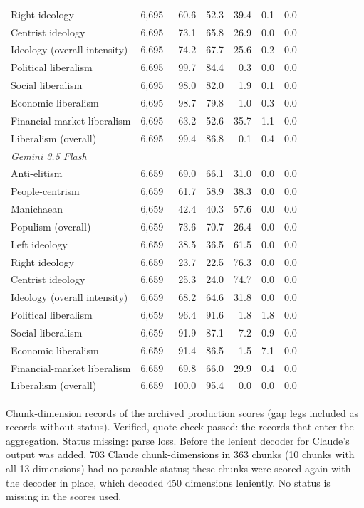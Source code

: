 \begin{table}[ht]
{\begin{tabular}{lrrrrrr}
\quad Right ideology & 6,695 & 60.6 & 52.3 & 39.4 & 0.1 & 0.0 \\
\quad Centrist ideology & 6,695 & 73.1 & 65.8 & 26.9 & 0.0 & 0.0 \\
\quad Ideology (overall intensity) & 6,695 & 74.2 & 67.7 & 25.6 & 0.2 & 0.0 \\
\quad Political liberalism & 6,695 & 99.7 & 84.4 & 0.3 & 0.0 & 0.0 \\
\quad Social liberalism & 6,695 & 98.0 & 82.0 & 1.9 & 0.1 & 0.0 \\
\quad Economic liberalism & 6,695 & 98.7 & 79.8 & 1.0 & 0.3 & 0.0 \\
\quad Financial-market liberalism & 6,695 & 63.2 & 52.6 & 35.7 & 1.1 & 0.0 \\
\quad Liberalism (overall) & 6,695 & 99.4 & 86.8 & 0.1 & 0.4 & 0.0 \\
\multicolumn{7}{l}{\emph{Gemini 3.5 Flash}} \\
\quad Anti-elitism & 6,659 & 69.0 & 66.1 & 31.0 & 0.0 & 0.0 \\
\quad People-centrism & 6,659 & 61.7 & 58.9 & 38.3 & 0.0 & 0.0 \\
\quad Manichaean & 6,659 & 42.4 & 40.3 & 57.6 & 0.0 & 0.0 \\
\quad Populism (overall) & 6,659 & 73.6 & 70.7 & 26.4 & 0.0 & 0.0 \\
\quad Left ideology & 6,659 & 38.5 & 36.5 & 61.5 & 0.0 & 0.0 \\
\quad Right ideology & 6,659 & 23.7 & 22.5 & 76.3 & 0.0 & 0.0 \\
\quad Centrist ideology & 6,659 & 25.3 & 24.0 & 74.7 & 0.0 & 0.0 \\
\quad Ideology (overall intensity) & 6,659 & 68.2 & 64.6 & 31.8 & 0.0 & 0.0 \\
\quad Political liberalism & 6,659 & 96.4 & 91.6 & 1.8 & 1.8 & 0.0 \\
\quad Social liberalism & 6,659 & 91.9 & 87.1 & 7.2 & 0.9 & 0.0 \\
\quad Economic liberalism & 6,659 & 91.4 & 86.5 & 1.5 & 7.1 & 0.0 \\
\quad Financial-market liberalism & 6,659 & 69.8 & 66.0 & 29.9 & 0.4 & 0.0 \\
\quad Liberalism (overall) & 6,659 & 100.0 & 95.4 & 0.0 & 0.0 & 0.0 \\
\bottomrule
\end{tabular}}
\par\smallskip
\begin{minipage}{\linewidth}\scriptsize Chunk-dimension records of the archived production scores (gap legs included as records without status). Verified, quote check passed: the records that enter the aggregation. Status missing: parse loss. Before the lenient decoder for Claude's output was added, 703 Claude chunk-dimensions in 363 chunks (10 chunks with all 13 dimensions) had no parsable status; these chunks were scored again with the decoder in place, which decoded 450 dimensions leniently. No status is missing in the scores used.\end{minipage}
\end{table}
